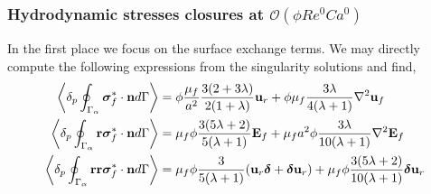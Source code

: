 \subsubsection{Hydrodynamic stresses closures at $\mathcal{O}(\phi Re^0 Ca^0)$}
In the first place we focus on the surface exchange terms. 
We may directly compute the following expressions from the singularity solutions and find, 
\begin{align}
    \pSavg{\bm\sigma_f^*\cdot \textbf{n}} &
    =
    \phi
    \frac{\mu_f}{a^2}
    \frac{3(2+3\lambda)}{2(1+\lambda)}\textbf{u}_r
    + \phi\mu_f  \frac{3\lambda}{4(\lambda +1)} \grad^2 \textbf{u}_f
    \label{eq:drag_forces}
    \\
    \pSavg{\textbf{r}\bm\sigma_f^*\cdot \textbf{n}} &
    = \mu_f \phi 
    \frac{3(5\lambda +2)}{5(\lambda +1)}\textbf{E}_f
    + \mu_f a^2 \phi \frac{3\lambda}{10(\lambda+1)}\grad^2  \textbf{E}_f
    \\
    \pSavg{\textbf{rr}\bm\sigma_f^*\cdot \textbf{n}} &
    =
    \mu_f \phi \frac{3}{5(\lambda +1)} (\textbf{u}_r \bm\delta + \bm\delta \textbf{u}_r)
    + \mu_f \phi \frac{3(5\lambda +2)}{10(\lambda+1)}\bm\delta \textbf{u}_r
    \\
\end{align}
